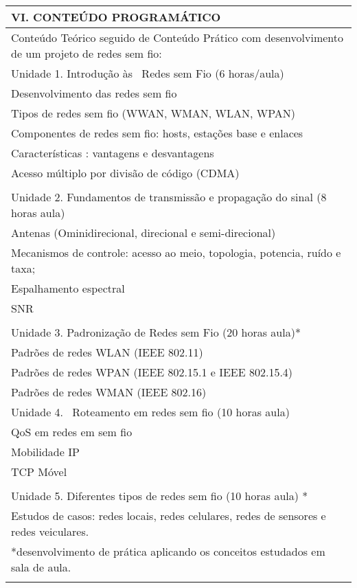 \documentclass[12pt]{article}
\begin{document}
\begin{longtable}{|L{1.025\textwidth}|} \hline
%
{\bf VI. CONTEÚDO PROGRAMÁTICO } \\ \hline
Conteúdo Teórico seguido de Conteúdo Prático com desenvolvimento de um projeto de redes sem fio: \\
Unidade 1. Introdução às  Redes sem Fio (6 horas/aula)\\
 Desenvolvimento das redes sem fio\\
 Tipos de redes sem fio (WWAN, WMAN, WLAN, WPAN)\\
 Componentes de redes sem fio: hosts, estações base e enlaces\\
 Características : vantagens e desvantagens\\
 Acesso múltiplo por divisão de código (CDMA)\\
\\
Unidade 2. Fundamentos de transmissão e propagação do sinal (8 horas aula)\\
 Antenas (Ominidirecional, direcional e semi-direcional)\\
 Mecanismos de controle: acesso ao meio, topologia, potencia, ruído e taxa;\\
 Espalhamento espectral\\
 SNR\\
\\
Unidade 3. Padronização de Redes sem Fio (20 horas aula)*\\
 Padrões de redes WLAN (IEEE 802.11)\\
 Padrões de redes WPAN (IEEE 802.15.1 e IEEE 802.15.4)\\
 Padrões de redes WMAN (IEEE 802.16)\\

Unidade 4.  Roteamento em redes sem fio (10 horas aula)\\
 QoS em redes em sem fio\\
Mobilidade IP\\
 TCP Móvel\\
\\
Unidade 5. Diferentes tipos de redes sem fio (10 horas aula) *\\
 Estudos de casos: redes locais, redes celulares, redes de sensores e redes veiculares.\\

*desenvolvimento de prática aplicando os conceitos estudados em sala de aula.\\



\\ \hline
\end{longtable} 
\end{document}
